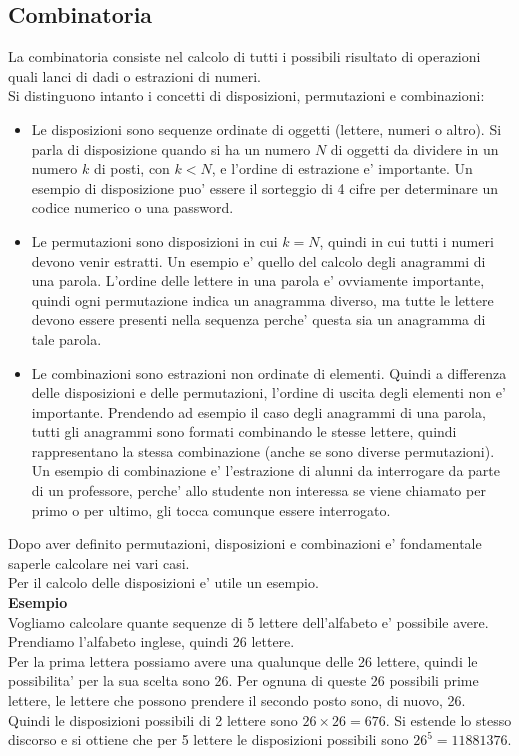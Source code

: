 \documentclass[12pt]{article}
\begin{document}
\subsection{Combinatoria}
La combinatoria consiste nel calcolo di tutti i possibili risultato di operazioni quali lanci di dadi o estrazioni di numeri. \\
Si distinguono intanto i concetti di disposizioni, permutazioni e combinazioni:
\begin{itemize}
	\item Le disposizioni sono sequenze ordinate di oggetti (lettere, numeri o altro). Si parla di disposizione quando si ha un numero $N$ di oggetti da dividere in un numero $k$ di posti, con $k<N$, e l'ordine di estrazione e' importante. Un esempio di disposizione puo' essere il sorteggio di 4 cifre per determinare un codice numerico o una password.
	\item Le permutazioni sono disposizioni in cui $k = N$, quindi in cui tutti i numeri devono venir estratti. Un esempio e' quello del calcolo degli anagrammi di una parola. L'ordine delle lettere in una parola e' ovviamente importante, quindi ogni permutazione indica un anagramma diverso, ma tutte le lettere devono essere presenti nella sequenza perche' questa sia un anagramma di tale parola.
	\item Le combinazioni sono estrazioni non ordinate di elementi. Quindi a differenza delle disposizioni e delle permutazioni, l'ordine di uscita degli elementi non e' importante. Prendendo ad esempio il caso degli anagrammi di una parola, tutti gli anagrammi sono formati combinando le stesse lettere, quindi rappresentano la stessa combinazione (anche se sono diverse permutazioni). Un esempio di combinazione e' l'estrazione di alunni da interrogare da parte di un professore, perche' allo studente non interessa se viene chiamato per primo o per ultimo, gli tocca comunque essere interrogato. 
\end{itemize}
Dopo aver definito permutazioni, disposizioni e combinazioni e' fondamentale saperle calcolare nei vari casi. \\
Per il calcolo delle disposizioni e' utile un esempio. \\
\textbf{Esempio} \\
Vogliamo calcolare quante sequenze di 5 lettere dell'alfabeto e' possibile avere. Prendiamo l'alfabeto inglese, quindi 26 lettere. \\
Per la prima lettera possiamo avere una qualunque delle 26 lettere, quindi le possibilita' per la sua scelta sono 26. Per ognuna di queste 26 possibili prime lettere, le lettere che possono prendere il secondo posto sono, di nuovo, 26. Quindi le disposizioni possibili di 2 lettere sono $26\times 26 = 676$. Si estende lo stesso discorso e si ottiene che per 5 lettere le disposizioni possibili sono $26^5 = 11881376$. \\
\end{document}
